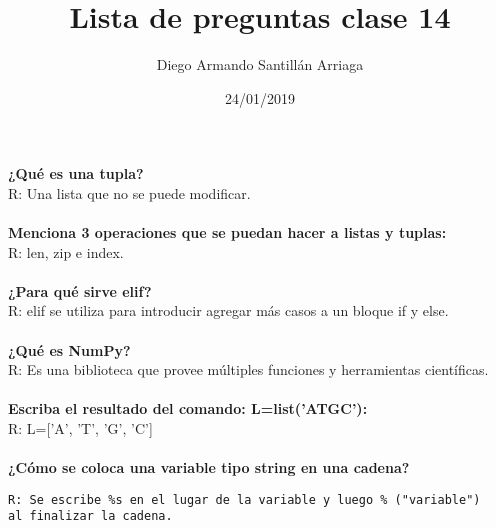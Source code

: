 \documentclass[letter paper, 12pt, oneside]{article}
\title{\Huge Lista de preguntas clase 14}
\author{Diego Armando Santillán Arriaga}
\date{24/01/2019}
\begin{document}
	\maketitle	
	\newpage
\textbf{¿Qué es una tupla?}
\\
R: Una lista que no se puede modificar. 
\\\\
\textbf{Menciona 3 operaciones que se puedan hacer a listas y tuplas:}
\\
R: len, zip e index.
\\\\
\textbf{¿Para qué sirve elif?}
\\
R: elif se utiliza para introducir agregar más casos a un bloque if y else. 
\\\\
\textbf{¿Qué es NumPy?}
\\
R: Es una biblioteca que provee múltiples funciones y herramientas científicas.
\\\\
\textbf{Escriba el resultado del comando: L=list('ATGC'):}
\\
R: L=['A', 'T', 'G', 'C']
\\\\
\textbf{¿Cómo se coloca una variable tipo string en una cadena?}
\begin{verbatim}
R: Se escribe %s en el lugar de la variable y luego % ("variable") 
al finalizar la cadena.
\end{verbatim}
\end{document}
